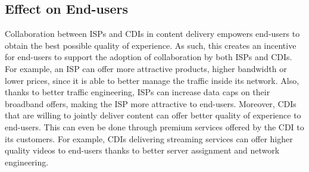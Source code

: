 \subsection{Effect on End-users}\label{sec:Users-Incentive} 

Collaboration between ISPs and CDIs in content delivery empowers end-users to
obtain the best possible quality of experience. As such, this creates an
incentive for end-users to support the adoption of collaboration by both ISPs
and CDIs. For example, an ISP can offer more attractive products, \ie higher
bandwidth or lower prices, since it is able to better manage the traffic inside
its network.  Also, thanks to better traffic engineering, ISPs can increase
data caps on their broadband offers, making the ISP more attractive to
end-users. Moreover, CDIs that are willing to jointly deliver content can offer
better quality of experience to end-users. This can even be done through
premium services offered by the CDI to its customers. For example, CDIs
delivering streaming services can offer higher quality videos to end-users
thanks to better server assignment and network engineering.
